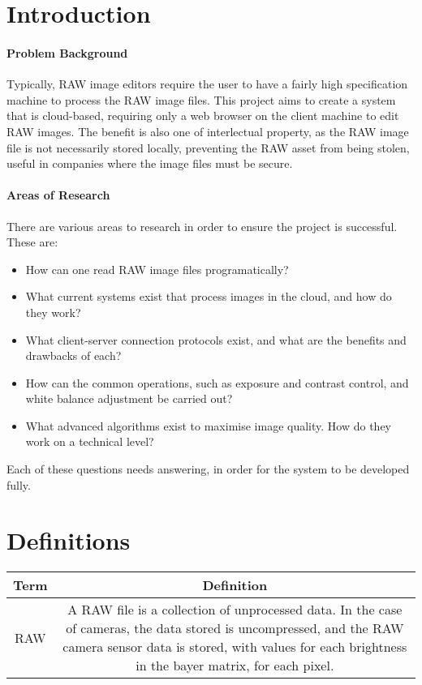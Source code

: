 \documentclass[14pt]{article}
\begin{document}
\maketitle


\section{Introduction}
\paragraph{Problem Background}
Typically, RAW image editors require the user to have a fairly high specification machine
to process the RAW image files. This project aims to create a system that is cloud-based,
requiring only a web browser on the client machine to edit RAW images. The benefit is also
one of interlectual property, as the RAW image file is not necessarily stored locally,
preventing the RAW asset from being stolen, useful in companies where the image files must
be secure.

\paragraph{Areas of Research}
There are various areas to research in order to ensure the project is successful. These are:

\begin{itemize}
  \item How can one read RAW image files programatically?
  \item What current systems exist that process images in the cloud, and how do they work?
  \item What client-server connection protocols exist, and what are the benefits and drawbacks of each?
  \item How can the common operations, such as exposure and contrast control, and white balance adjustment be carried out?
  \item What advanced algorithms exist to maximise image quality. How do they work on a technical level?
\end{itemize}

Each of these questions needs answering, in order for the system to be developed fully.

\section{Definitions}
\begin{tabular}{| c | c |}
    Term & Definition \\
    \hline
    RAW & A RAW file is a collection of unprocessed data. In the case of cameras, the data stored
          is uncompressed, and the RAW camera sensor data is stored, with values for each brightness in the bayer matrix, for each pixel.
\end{tabular}
\end{document}
